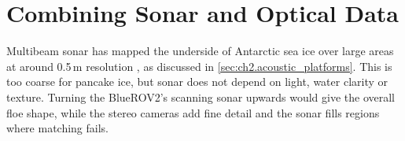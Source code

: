 \section{Combining Sonar and Optical Data}
Multibeam sonar has mapped the underside of Antarctic sea ice over large areas at around 0.5\,m resolution
\cite{williamsThickDeformedAntarctic2015}, as discussed in \autoref{sec:ch2.acoustic_platforms}. This is too coarse for
pancake ice, but sonar does not depend on light, water clarity or texture. Turning the BlueROV2's scanning
sonar upwards would give the overall floe shape, while the stereo cameras add fine detail and the sonar fills
regions where matching fails.

\label{body:end}


